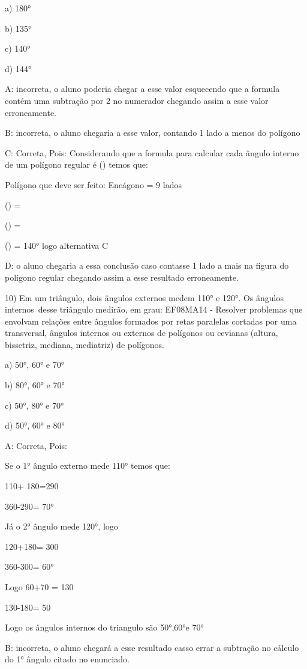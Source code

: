 a) 180°

b) 135°

c) 140°

d) 144°

A: incorreta, o aluno poderia chegar a esse valor esquecendo que a
formula contém uma subtração por 2 no numerador chegando assim a esse
valor erroneamente.

B: incorreta, o aluno chegaria a esse valor, contando 1 lado a menos do
polígono

C: Correta, Pois: Considerando que a formula para calcular cada ângulo
interno de um polígono regular é
() temos que:

Polígono que deve ser feito: Eneágono = 9 lados

() =

() =

() = 140° logo alternativa C

D: o aluno chegaria a essa conclusão caso contasse 1 lado a mais na
figura do polígono regular chegando assim a esse resultado erroneamente.

10) Em um triângulo, dois ângulos externos medem 110° e 120°. Os ângulos
internos~desse triângulo medirão, em grau: EF08MA14 - Resolver problemas
que envolvam relações entre ângulos formados por retas paralelas
cortadas por uma transversal, ângulos internos ou externos de polígonos
ou cevianas (altura, bissetriz, mediana, mediatriz) de polígonos.

a) 50°, 60° e 70°

b) 80°, 60° e 70°

c) 50°, 80° e 70°

d) 50°, 60° e 80°

A: Correta, Pois:

Se o 1° ângulo externo mede 110° temos que:

110+ 180=290

360-290= 70°

Já o 2° ângulo mede 120°, logo

120+180= 300

360-300= 60°

Logo 60+70 = 130

130-180= 50

Logo os ângulos internos do triangulo são 50°,60°e 70°

B: incorreta, o aluno chegará a esse resultado casso errar a subtração
no cálculo do 1° ângulo citado no enunciado.

